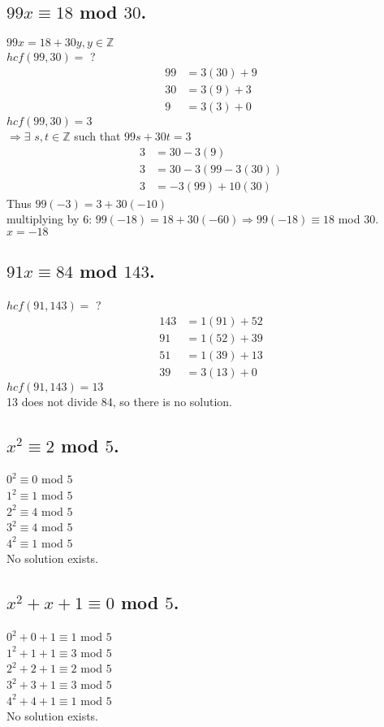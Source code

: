 \documentclass[12pt]{article}
\begin{document}
\subsection{$99x \equiv 18$ mod $30$.}
$99x = 18 + 30y, y \in \mathds{Z}$\\
$hcf(99,30) =$ ?
\begin{align*}
    99 &= 3(30) + 9\\
    30 &= 3(9) + 3\\
    9 &= 3(3) + 0
\end{align*}
$hcf(99,30) = 3$ \\
$\Rightarrow \exists$ $s,t \in \mathds{Z}$ such that $99s + 30t = 3$
\begin{align*}
    3 &= 30 - 3(9)\\
    3 &= 30 - 3(99 - 3(30))\\
    3 &= -3(99) + 10(30)
\end{align*}
Thus $99(-3) = 3 + 30(-10)$\\
multiplying by 6: $99(-18) = 18 + 30(-60) \Rightarrow 99(-18) \equiv 18$ mod $30$.\\
$x = -18$

\subsection{$91x \equiv 84$ mod $143$.}
$hcf(91, 143) =$ ?
\begin{align*}
    143 &= 1(91) + 52\\
    91 &= 1(52) + 39\\
    51 &= 1(39) + 13\\
    39 &= 3(13) + 0
\end{align*}
$hcf(91, 143) = 13$\\
13 does not divide 84, so there is no solution.

\subsection{$x^2 \equiv 2$ mod $5$.}
$0^2 \equiv 0$ mod $5$\\
$1^2 \equiv 1$ mod $5$\\
$2^2 \equiv 4$ mod $5$\\
$3^2 \equiv 4$ mod $5$\\
$4^2 \equiv 1$ mod $5$\\
No solution exists.

\subsection{$x^2 + x + 1 \equiv 0$ mod $5$.}
$0^2+0+1 \equiv 1$ mod $5$\\
$1^2+1+1 \equiv 3$ mod $5$\\
$2^2+2+1 \equiv 2$ mod $5$\\
$3^2+3+1 \equiv 3$ mod $5$\\
$4^2+4+1 \equiv 1$ mod $5$\\
No solution exists.
\end{document}
